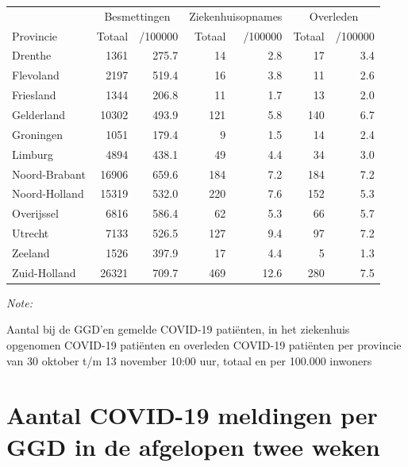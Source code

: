 \documentclass[
  english,
  man,floatsintext]{apa6}
\begin{document}
\begin{table}[H]
\centering
\begin{threeparttable}
\begin{tabular}{lrrrrrr}
\toprule
\multicolumn{1}{c}{ } & \multicolumn{2}{c}{Besmettingen} & \multicolumn{2}{c}{Ziekenhuisopnames} & \multicolumn{2}{c}{Overleden} \\
\cmidrule(l{3pt}r{3pt}){2-3} \cmidrule(l{3pt}r{3pt}){4-5} \cmidrule(l{3pt}r{3pt}){6-7}
Provincie & Totaal & /100000 & Totaal & /100000 & Totaal & /100000\\
\midrule
Drenthe & 1361 & 275.7 & 14 & 2.8 & 17 & 3.4\\
Flevoland & 2197 & 519.4 & 16 & 3.8 & 11 & 2.6\\
Friesland & 1344 & 206.8 & 11 & 1.7 & 13 & 2.0\\
Gelderland & 10302 & 493.9 & 121 & 5.8 & 140 & 6.7\\
Groningen & 1051 & 179.4 & 9 & 1.5 & 14 & 2.4\\
Limburg & 4894 & 438.1 & 49 & 4.4 & 34 & 3.0\\
Noord-Brabant & 16906 & 659.6 & 184 & 7.2 & 184 & 7.2\\
Noord-Holland & 15319 & 532.0 & 220 & 7.6 & 152 & 5.3\\
Overijssel & 6816 & 586.4 & 62 & 5.3 & 66 & 5.7\\
Utrecht & 7133 & 526.5 & 127 & 9.4 & 97 & 7.2\\
Zeeland & 1526 & 397.9 & 17 & 4.4 & 5 & 1.3\\
Zuid-Holland & 26321 & 709.7 & 469 & 12.6 & 280 & 7.5\\
\bottomrule
\end{tabular}
\begin{tablenotes}
\item \textit{Note: } 
\item Aantal bij de GGD’en gemelde COVID-19 patiënten, in het ziekenhuis opgenomen COVID-19 patiënten en overleden COVID-19 patiënten per provincie van 30 oktober t/m 13 november 10:00 uur, totaal en per 100.000 inwoners
\end{tablenotes}
\end{threeparttable}
\end{table}

\newpage

\hypertarget{aantal-covid-19-meldingen-per-ggd-in-de-afgelopen-twee-weken}{%
\section{Aantal COVID-19 meldingen per GGD in de afgelopen twee weken}\label{aantal-covid-19-meldingen-per-ggd-in-de-afgelopen-twee-weken}}
\end{document}
